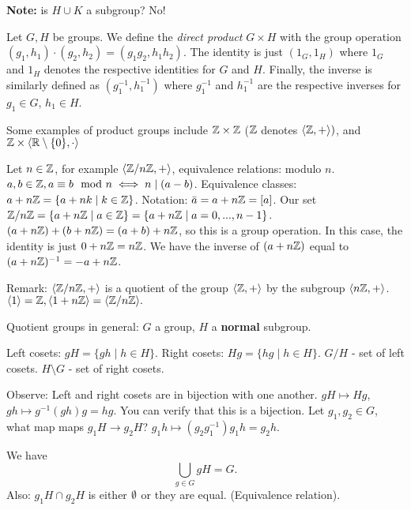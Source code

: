 \textbf{Note:} is $H \cup K$ a subgroup? No!

\begin{definition}
    Let $G,H$ be groups. We define the \emph{direct product} $G \times H$ with the group operation $(g_1,h_1)\cdot(g_2,h_2)=(g_1g_2,h_1h_2)$. The identity is just $(1_G,1_H)$ where $1_G$ and $1_H$ denotes the respective identities for $G$ and $H$. Finally, the inverse is similarly defined as $(g_1^{-1},h_1^{-1})$ where $g_1^{-1}$ and $h_1^{-1}$ are the respective inverses for $g_1\in G$, $h_1\in H$.
\end{definition}

Some examples of product groups include $\mathbb{Z} \times \mathbb{Z}$ ($\mathbb{Z}$ denotes $\langle \mathbb{Z},+ \rangle )$, and $\mathbb{Z} \times \langle \mathbb{R}\setminus\{0\} , \cdot \rangle $

\begin{example}
    Let $n \in \mathbb{Z}$, for example $ \langle \mathbb{Z} /n\mathbb{Z}, + \rangle $, equivalence relations: modulo $n$. $a,b \in \mathbb{Z}, a \equiv b \mod n \iff n \mid (a-b)$. Equivalence classes: $a+n\mathbb{Z} = \{ a+nk \mid k \in \mathbb{Z} \}$. Notation: $\bar{a}=a+n\mathbb{Z}=[a]$. Our set $\mathbb{Z} /n\mathbb{Z}=\{a+n\mathbb{Z} \mid a \in \mathbb{Z} \} = \{ a + n\mathbb{Z} \mid a=0, ... , n-1 \}$. $(a+n\mathbb{Z})+(b+n\mathbb{Z})=(a+b)+n\mathbb{Z}$, so this is a group operation. In this case, the identity is just $0+n\mathbb{Z}=n\mathbb{Z}$. We have the inverse of $(a+n\mathbb{Z})$ equal to $(a+n\mathbb{Z})^{-1}=-a+n\mathbb{Z}$.
\end{example}

Remark: $ \langle \mathbb{Z}/n\mathbb{Z},+  \rangle $ is a quotient of the group $\langle \mathbb{Z},+ \rangle $ by the subgroup $\langle n\mathbb{Z},+  \rangle $. $\langle 1 \rangle =\mathbb{Z}, \langle 1+n\mathbb{Z} \rangle = \langle \mathbb{Z}/n\mathbb{Z} \rangle.$

Quotient groups in general: $G$ a group, $H$ a \textbf{normal} subgroup. 

\begin{definition}[Cosets]
    Left cosets: $gH=\{ gh \mid h \in H \}.$
    Right cosets: $Hg=\{ hg \mid h \in H \}.$
    $G/H$ - set of left cosets.
    $H\setminus G$ - set of right cosets.
\end{definition}
Observe: Left and right cosets are in bijection with one another. $gH \mapsto Hg$, $gh \mapsto g^{-1}(gh)g=hg$. You can verify that this is a bijection. Let $g_1,g_2 \in G$, what map maps $g_1H \to g_2H$? $g_1h \mapsto (g_2g_1^{-1})g_1h=g_2h.$

\begin{note} We have
   \[
\bigcup_{g\in G} gH = G.
   \]
Also: $g_1H \cap g_2H $ is either $\emptyset$ or they are equal. (Equivalence relation).
\end{note}



